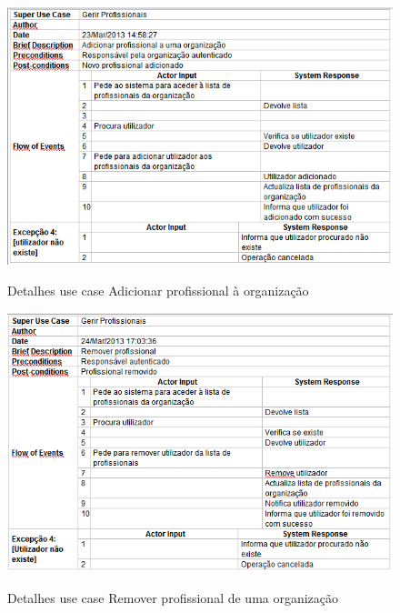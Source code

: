 ﻿\documentclass[12pt,a4paper]{article}
\begin{document}
\begin{figure}[h!]
\centering
\includegraphics[scale=0.7]{d_usecase/adicionarprofissional}
\label{usecase}
\caption{Detalhes use case Adicionar profissional à organização}
\end{figure}



\begin{figure}[h!]
\centering
\includegraphics[scale=0.7]{d_usecase/removerprofissional}
\label{usecase}
\caption{Detalhes use case Remover profissional de uma organização}
\end{figure}
\end{document}
